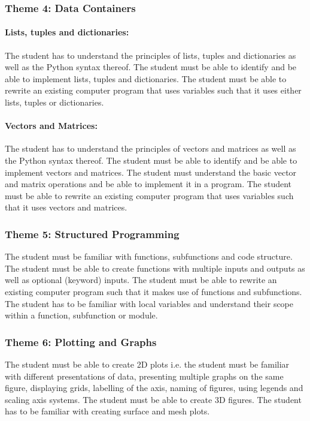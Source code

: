             
        \subsubsection{Theme 4: Data Containers}
            \paragraph{Lists, tuples and dictionaries:}
                The student has to understand the principles of lists, tuples and 
                dictionaries as well as the Python syntax thereof. The student must
                be able to identify and be able to implement lists, tuples and 
                dictionaries. The student must be able to rewrite an existing 
                computer program that uses variables such that it uses either
                lists, tuples or dictionaries.
                
            \paragraph{Vectors and Matrices:}
                The student has to understand the principles of vectors and 
                matrices as well as the Python syntax thereof. The student must
                be able to identify and be able to implement vectors and matrices.
                The student must understand the basic vector and matrix operations
                and be able to implement it in a program. The student must be able
                to rewrite an existing computer program that uses variables
                such that it uses vectors and matrices.

        
        \subsubsection{Theme 5: Structured Programming}
            The student must be familiar with functions, subfunctions and code 
            structure. The student must be able to create functions with multiple 
            inputs and outputs as well as optional (keyword) inputs. The student 
            must be able to rewrite an existing computer program such that it makes
            use of functions and subfunctions. The student has to be familiar with 
            local variables and understand their scope within a function, 
            subfunction or module.

            
        \subsubsection{Theme 6: Plotting and Graphs}
            The student must be able to create 2D plots i.e. the student must be 
            familiar with different presentations of data, presenting multiple 
            graphs on the same figure, displaying grids, labelling of the axis, 
            naming of figures, using legends and scaling axis systems.
            The student must be able to create 3D figures. The student has to be 
            familiar with creating surface and mesh plots.

